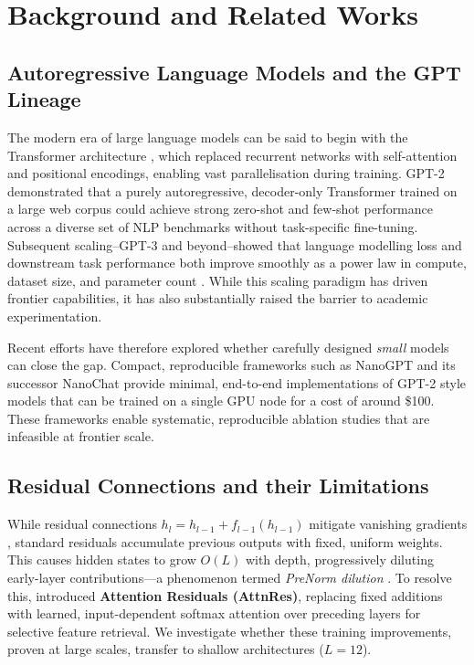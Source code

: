 \section{Background and Related Works}

\subsection{Autoregressive Language Models and the GPT Lineage}

The modern era of large language models can be said to begin with the Transformer architecture
\parencite{vaswani2017attention}, which replaced recurrent networks with self-attention and
positional encodings, enabling vast parallelisation during training.
GPT-2 \parencite{radford2019gpt2} demonstrated that a purely autoregressive, decoder-only
Transformer trained on a large web corpus could achieve strong zero-shot and few-shot performance
across a diverse set of NLP benchmarks without task-specific fine-tuning.
Subsequent scaling--GPT-3 \parencite{brown2020language} and beyond--showed that language
modelling loss and downstream task performance both improve smoothly as a power law in compute, dataset size, and parameter count \parencite{hoffmann2022chinchilla}.
While this scaling paradigm has driven frontier capabilities, it has also substantially raised
the barrier to academic experimentation.

Recent efforts have therefore explored whether carefully designed \emph{small} models can close the gap.
Compact, reproducible frameworks such as NanoGPT \parencite{karpathy2022nanogpt} and its
successor NanoChat \parencite{nanochat} provide minimal, end-to-end implementations of GPT-2
style models that can be trained on a single GPU node for a cost of around \$100. These frameworks enable systematic, reproducible ablation studies that are infeasible at frontier scale.

\subsection{Residual Connections and their Limitations}
While residual connections $h_l = h_{l-1} + f_{l-1}(h_{l-1})$ mitigate vanishing gradients \parencite{he2016deep, vaswani2017attention}, standard residuals accumulate previous outputs with fixed, uniform weights. This causes hidden states to grow $O(L)$ with depth, progressively diluting early-layer contributions---a phenomenon termed \emph{PreNorm dilution} \parencite{chen2026attnres}. To resolve this, \textcite{chen2026attnres} introduced \textbf{Attention Residuals (AttnRes)}, replacing fixed additions with learned, input-dependent softmax attention over preceding layers for selective feature retrieval. We investigate whether these training improvements, proven at large scales, transfer to shallow architectures ($L=12$).

